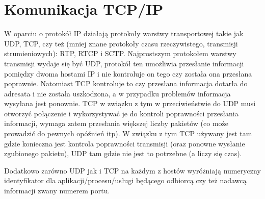 \documentclass{pdfBooklets}
\begin{document}
\section{Komunikacja TCP/IP}
W oparciu o protokół IP działają protokoły warstwy transportowej takie jak UDP, TCP, czy też (mniej znane protokoły czasu rzeczywistego, transmisji strumieniowych): RTP, RTCP i SCTP.
Najprostszym protokołem warstwy transmisji wydaje się być UDP, protokół ten umożliwia przesłanie informacji pomiędzy dwoma hostami IP i nie kontroluje on tego czy została ona przesłana poprawnie.
Natomiast TCP kontroluje to czy przesłana informacja dotarła do adresata i nie została uszkodzona, a w przypadku problemów informacja wysyłana jest ponownie. TCP w związku z tym w przeciwieństwie do UDP musi otworzyć połączenie i wykorzystywać je do kontroli poprawności przesłania informacji, wymaga zatem przesłania większej liczby pakietów (co może prowadzić do pewnych opóźnień itp).
W związku z tym TCP używany jest tam gdzie konieczna jest kontrola poprawności transmisji (oraz ponowne wysłanie zgubionego pakietu), UDP tam gdzie nie jest to potrzebne (a liczy się czas).

Dodatkowo zarówno UDP jak i TCP na każdym z hostów wyróżniają numeryczny identyfikator dla aplikacji/procesu/usługi będącego odbiorcą czy też nadawcą informacji zwany numerem portu.

\end{document}

